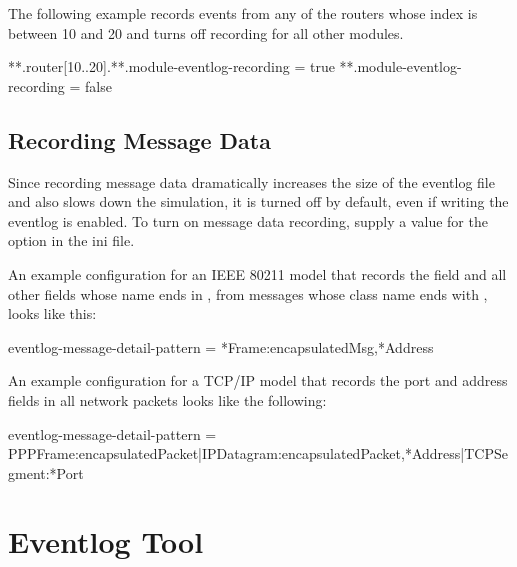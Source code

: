 The following example records events from any of the routers whose index is
between 10 and 20 and turns off recording for all other modules.

\begin{inifile}
**.router[10..20].**.module-eventlog-recording = true
**.module-eventlog-recording = false
\end{inifile}

\subsection{Recording Message Data}
\label{sec:eventlog:recording-messages}

Since recording message data dramatically increases the size of the eventlog
file and also slows down the simulation, it is turned off by default, even if
writing the eventlog is enabled. To turn on message data recording, supply a
value for the  option in the ini file.



An example configuration for an IEEE 80211 model that records the
 field and all other fields whose name ends in
, from messages whose class name ends with , looks like
this:

\begin{inifile}
eventlog-message-detail-pattern = *Frame:encapsulatedMsg,*Address
\end{inifile}

An example configuration for a TCP/IP model that records the port and address
fields in all network packets looks like the following:

\begin{inifile}
eventlog-message-detail-pattern =
 PPPFrame:encapsulatedPacket|IPDatagram:encapsulatedPacket,*Address|TCPSegment:*Port
\end{inifile}

%
%

\section{Eventlog Tool}
\label{sec:eventlog:eventlog-tool}

